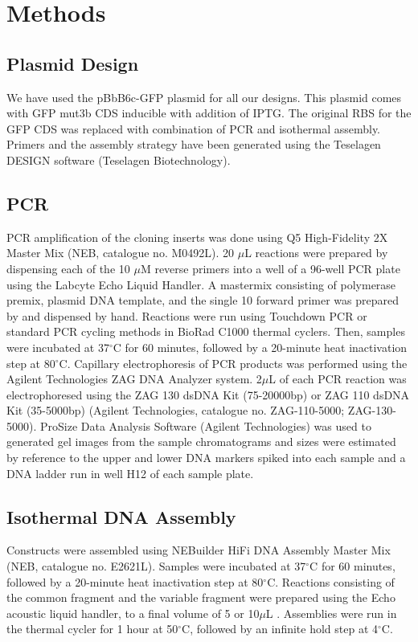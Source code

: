 \section{Methods}

\subsection{Plasmid Design}

We have used the pBbB6c-GFP plasmid for all our designs. This plasmid comes with GFP mut3b CDS inducible with addition of IPTG. The original RBS for the GFP CDS was replaced with combination of PCR and isothermal assembly. Primers and the assembly strategy have been generated using the Teselagen DESIGN software (Teselagen Biotechnology).

\subsection{PCR}
PCR amplification of the cloning inserts was done using Q5 High-Fidelity 2X Master Mix (NEB, catalogue no. M0492L). 20 $\mu$L reactions were prepared by dispensing each of the 10 $\mu$M reverse primers into a well of a 96-well PCR plate using the Labcyte Echo Liquid Handler. A mastermix consisting of polymerase premix, plasmid DNA template, and the single 10 forward primer was prepared by and dispensed by hand. Reactions were run using Touchdown PCR or standard PCR cycling methods in BioRad C1000 thermal cyclers. Then, samples were incubated at 37$^{\circ}$C for 60 minutes, followed by a 20-minute heat inactivation step at 80$^{\circ}$C.
Capillary electrophoresis of PCR products was performed using the Agilent Technologies ZAG DNA Analyzer system. 2$\mu$L of each PCR reaction was electrophoresed using the ZAG 130 dsDNA Kit (75-20000bp) or ZAG 110 dsDNA Kit (35-5000bp) (Agilent Technologies, catalogue no. ZAG-110-5000; ZAG-130-5000). ProSize Data Analysis Software (Agilent Technologies) was used to generated gel images from the sample chromatograms and sizes were estimated by reference to the upper and lower DNA markers spiked into each sample and a DNA ladder run in well H12 of each sample plate. 

\subsection{Isothermal DNA Assembly}
Constructs were assembled using NEBuilder HiFi DNA Assembly Master Mix (NEB, catalogue no. E2621L). Samples were incubated at 37$^{\circ}$C for 60 minutes, followed by a 20-minute heat inactivation step at 80$^{\circ}$C. Reactions consisting of the common fragment and the variable fragment were prepared using the Echo acoustic liquid handler, to a final volume of 5 or 10\(\mu\)L . Assemblies were run in the thermal cycler for 1 hour at 50$^{\circ}$C, followed by an infinite hold step at 4$^{\circ}$C.

